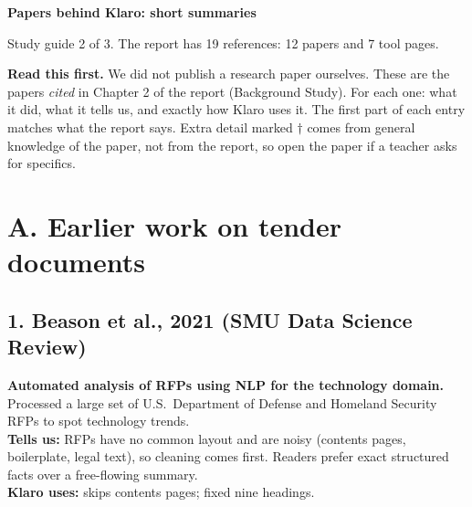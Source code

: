 

{\LARGE\bfseries\color{ac} Papers behind Klaro: short summaries}\par
\vspace{2pt}Study guide 2 of 3. The report has 19 references: 12 papers and 7 tool pages.

\textbf{Read this first.} We did not publish a research paper ourselves. These are the papers \emph{cited} in Chapter 2 of the report (Background Study). For each one: what it did, what it tells us, and exactly how Klaro uses it. The first part of each entry matches what the report says. Extra detail marked $\dagger$ comes from general knowledge of the paper, not from the report, so open the paper if a teacher asks for specifics.


\section{A. Earlier work on tender documents}

\subsection*{1. Beason et al., 2021 (SMU Data Science Review)}
\textbf{Automated analysis of RFPs using NLP for the technology domain.}\\
Processed a large set of U.S.\ Department of Defense and Homeland Security RFPs to spot technology trends.\\
\textbf{Tells us:} RFPs have no common layout and are noisy (contents pages, boilerplate, legal text), so cleaning comes first. Readers prefer exact structured facts over a free-flowing summary.\\
\textbf{Klaro uses:} skips contents pages; fixed nine headings.

